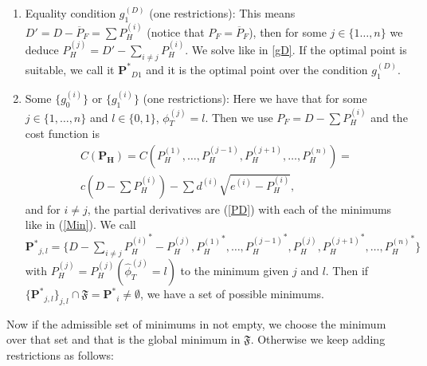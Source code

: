 \documentclass[12pt]{article}
\theoremstyle{definition}
\theoremstyle{remark}
\begin{document}
\begin{enumerate}
\item Equality condition $g^{(D)}_1$ (one restrictions): This means $D'=D-\overline{P}_F=\sum P_H^{(i)}$ (notice that $P_F=\overline{P}_F$), then for some $j\in\{1\dots,n\}$ we deduce $P_H^{(j)}=D'-\sum_{i\neq j}P_H^{(i)}$. We solve like in \ref{gD}. If the optimal point is suitable, we call it $\bm{P^*}_{D1}$ and it is the optimal point over the condition $g^{(D)}_1$.

\item Some $\{g_0^{(i)}\}$ or $\{g_1^{(i)}\}$ (one restrictions): Here we have that for some $j\in\{1,\dots,n\}$ and $l\in\{0,1\}$, $\phi_T^{(j)}=l$. Then we use $P_F=D-\sum P_H^{(i)}$ and the cost function is
\begin{multline*}
C(\bm{P_H})=C(P_H^{(1)},\dots,P_H^{(j-1)},P_H^{(j+1)},\dots,P_H^{(n)})=\\
c(D-\sum P_H^{(i)})-\sum d^{(i)}\sqrt{e^{(i)}-P_H^{(i)}},
\end{multline*}
and for $i\neq j$, the partial derivatives are (\ref{PD}) with each of the minimums like in (\ref{Min}). We call $\bm{P^*}_{j,l}=\{D-\sum_{i\neq j}{P_H^{(i)}}^*-P_H^{(j)},{P_H^{(1)}}^*,\dots,{P_H^{(j-1)}}^*,{P_H^{(j)}},{P_H^{(j+1)}}^*,\dots,{P_H^{(n)}}^*\}$ with ${P_H^{(j)}}={P_H^{(j)}}(\hat{\phi}_T^{(j)}=l)$ to the minimum given $j$ and $l$. Then if $\{\bm{P^*}_{j,l}\}_{j,l}\cap\mathfrak{F}=\bm{P^*}_i\neq\emptyset$, we have a set of possible minimums.

\end{enumerate}

Now if the admissible set of minimums in not empty, we choose the minimum over that set and that is the global minimum in $\mathfrak{F}$. Otherwise we keep adding restrictions as follows:
\end{document}
